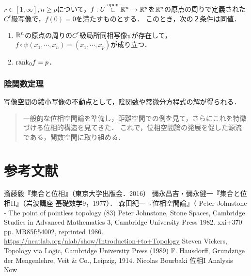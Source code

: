 \documentclass[uplatex,dvipdfmx]{jsreport}
\begin{document}
\begin{corollary}[低次元への写像の場合]\label{cor-implicit-function-2}
    $r\in[1,\infty],n\ge p$について，$f:U\overset{\mathrm{open}}{\subset}\mathbb{R}^n\to\mathbb{R}^p$を$\mathbb{R}^n$の原点の周りで定義された$C^r$級写像で，$f(0)=0$を満たすものとする．
    このとき，次の２条件は同値．
    \begin{enumerate}
        \item $\mathbb{R}^n$の原点の周りの$C^r$級局所同相写像$\psi$が存在して，$f\circ\psi(x_1,\cdots,x_n)=(x_1,\cdots,x_p)$が成り立つ．
        \item $\mathrm{rank}_0f=p$．
    \end{enumerate}
\end{corollary}


\subsection{陰関数定理}

\begin{tcolorbox}[colframe=ForestGreen, colback=ForestGreen!10!white,breakable,colbacktitle=ForestGreen!40!white,coltitle=black,fonttitle=\bfseries\sffamily,
title=]
    写像空間の縮小写像の不動点として，陰関数や常微分方程式の解が得られる．
\end{tcolorbox}

\begin{quotation}
    一般的な位相空間論を準備し，距離空間での例を見て，さらにこれを特徴づける位相的構造を見てきた．
    これで，位相空間論の発展を促した源流である，関数空間に取り組める．
\end{quotation}

\chapter{参考文献}

\begin{thebibliography}{99}
    斎藤毅『集合と位相』（東京大学出版会．2016）
    彌永昌吉・彌永健一『集合と位相II』（岩波講座 基礎数学9，1977）．
    森田紀一『位相空間論』（
        Peter Johnstone - The point of pointless topology (83)
        Peter Johnstone, Stone Spaces, Cambridge Studies in Advanced Mathematics 3, Cambridge University Press 1982. xxi+370 pp. MR85f:54002, reprinted 1986.
        \url{https://ncatlab.org/nlab/show/Introduction+to+Topology}
        Steven Vickers, Topology via Logic, Cambridge University Press (1989)
    F. Hausdorff, Grundzüge der Mengenlehre, Veit \& Co., Leipzig, 1914.
    Nicolas Bourbaki 位相I
    Analysis Now
\end{thebibliography}
\end{document}
